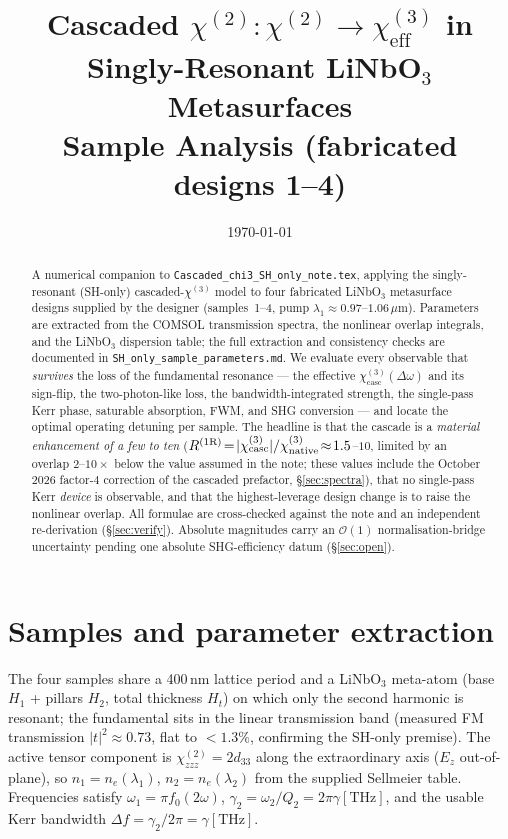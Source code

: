 \documentclass[11pt,a4paper]{article}
\newcommand{\chitwo}{\chi^{(2)}}
\newcommand{\chithree}{\chi^{(3)}}
\newcommand{\Dom}{\Delta\omega}
\newcommand{\chicasc}{\chithree_{\text{casc}}}
\begin{document}
\title{Cascaded $\chitwo{:}\chitwo \to \chithree_\text{eff}$ in Singly-Resonant
       LiNbO$_3$ Metasurfaces\\[2pt]
       \large Sample Analysis (fabricated designs 1--4)}
\author{}
\date{\today}
\maketitle

\begin{abstract}
\noindent
A numerical companion to \texttt{Cascaded\_chi3\_SH\_only\_note.tex}, applying the
singly-resonant (SH-only) cascaded-$\chithree$ model to four fabricated LiNbO$_3$
metasurface designs supplied by the designer (samples~1--4, pump
$\lambda_1\!\approx\!0.97$--$1.06\,\mu$m). Parameters are extracted from the
COMSOL transmission spectra, the nonlinear overlap integrals, and the LiNbO$_3$
dispersion table; the full extraction and consistency checks are documented in
\texttt{SH\_only\_sample\_parameters.md}. We evaluate every observable that
\emph{survives} the loss of the fundamental resonance --- the effective
$\chicasc(\Dom)$ and its sign-flip, the two-photon-like loss, the
bandwidth-integrated strength, the single-pass Kerr phase, saturable absorption,
FWM, and SHG conversion --- and locate the optimal operating detuning per sample.
The headline is that the cascade is a \emph{material enhancement of a few to
ten} ($R^{(1\mathrm R)}\!=\!|\chicasc|/\chithree_{\rm native}\!\approx\!1.5$--$10$,
limited by an overlap $2$--$10\times$ below the value assumed in the note;
these values include the October 2026 factor-$4$ correction of the cascaded
prefactor, \S\ref{sec:spectra}), that no single-pass
Kerr \emph{device} is observable, and that the highest-leverage design change is
to raise the nonlinear overlap. All formulae are cross-checked against the
note and an independent re-derivation (\S\ref{sec:verify}). Absolute magnitudes
carry an $\mathcal{O}(1)$ normalisation-bridge uncertainty pending one absolute
SHG-efficiency datum (\S\ref{sec:open}).
\end{abstract}

\tableofcontents
\bigskip

\section{Samples and parameter extraction}
\label{sec:samples}

The four samples share a 400\,nm lattice period and a LiNbO$_3$ meta-atom (base
$H_1$ + pillars $H_2$, total thickness $H_t$) on which only the second harmonic is
resonant; the fundamental sits in the linear transmission band (measured FM
transmission $|t|^2\!\approx\!0.73$, flat to $<\!1.3\%$, confirming the SH-only
premise). The active tensor component is $\chitwo_{zzz}=2d_{33}$ along the
extraordinary axis ($E_z$ out-of-plane), so $n_1=n_e(\lambda_1)$,
$n_2=n_e(\lambda_2)$ from the supplied Sellmeier table. Frequencies satisfy
$\omega_1=\pi f_0(2\omega)$, $\gamma_2 = \omega_2/Q_2 = 2\pi\gamma[\text{THz}]$,
and the usable Kerr bandwidth $\Delta f = \gamma_2/2\pi = \gamma[\text{THz}]$.
\end{document}
